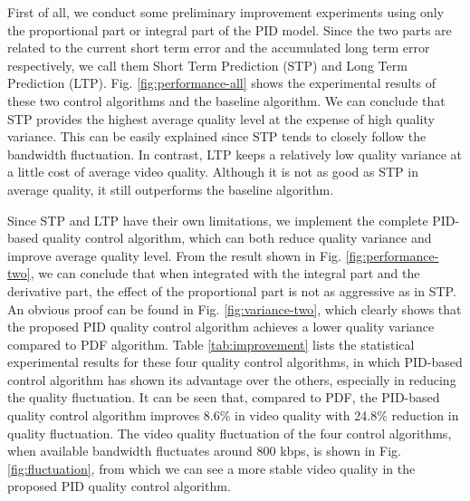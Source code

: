 \documentclass[journal]{IEEEtran}
\begin{document}
First of all, we conduct some preliminary improvement experiments using only the proportional part or integral part of the PID model. Since the two parts are related to the current short term error and the accumulated long term error respectively, we call them Short Term Prediction (STP) and Long Term Prediction (LTP). Fig. \ref{fig:performance-all} shows the experimental results of these two control algorithms and the baseline algorithm. We can conclude that STP provides the highest average quality level at the expense of high quality variance. This can be easily explained since STP tends to closely follow the bandwidth fluctuation. In contrast, LTP keeps a relatively low quality variance at a little cost of average video quality. Although it is not as good as STP in average quality, it still outperforms the baseline algorithm.

Since STP and LTP have their own limitations, we implement the complete PID-based quality control algorithm, which can both reduce quality variance and improve average quality level. From the result shown in Fig. \ref{fig:performance-two}, we can conclude that when integrated with the integral part and the derivative part, the effect of the proportional part is not as aggressive as in STP. An obvious proof can be found in Fig. \ref{fig:variance-two}, which clearly shows that the proposed PID quality control algorithm achieves a lower quality variance compared to PDF algorithm. Table \ref{tab:improvement} lists the statistical experimental results for these four quality control algorithms, in which PID-based control algorithm has shown its advantage over the others, especially in reducing the quality fluctuation. It can be seen that, compared to PDF, the PID-based quality control algorithm improves 8.6\% in video quality with 24.8\% reduction in quality fluctuation. The video quality fluctuation of the four control algorithms, when available bandwidth fluctuates around 800 kbps, is shown in Fig. \ref{fig:fluctuation}, from which we can see a more stable video quality in the proposed PID quality control algorithm.
\end{document}
